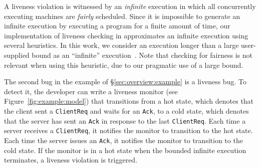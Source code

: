 A liveness violation is witnessed by an \emph{infinite} execution in which all concurrently executing \psharp machines are \emph{fairly} scheduled. Since it is impossible to generate an infinite execution by executing a program for a finite amount of time, our implementation of liveness checking in \psharp approximates an infinite execution using several heuristics. In this work, we consider an execution longer than a large user-supplied bound as an ``infinite'' execution~\cite{killian2007life, musuvathi2008fair}. Note that checking for fairness is not relevant when using this heuristic, due to our pragmatic use of a large bound.


The second bug in the example of \S\ref{sec:overview:example} is a liveness bug. To detect it, the developer can write a liveness monitor (see Figure~\ref{fig:example:model}) that transitions from a hot state, which denotes that the client sent a \texttt{ClientReq} and waits for an \texttt{Ack}, to a cold state, which denotes that the server has sent an \texttt{Ack} in response to the last \texttt{ClientReq}. Each time a server receives a \texttt{ClientReq}, it notifies the monitor to transition to the hot state. Each time the server issues an \texttt{Ack}, it notifies the monitor to transition to the cold state. If the monitor is in a hot state when the bounded infinite execution terminates, a liveness violation is triggered.



